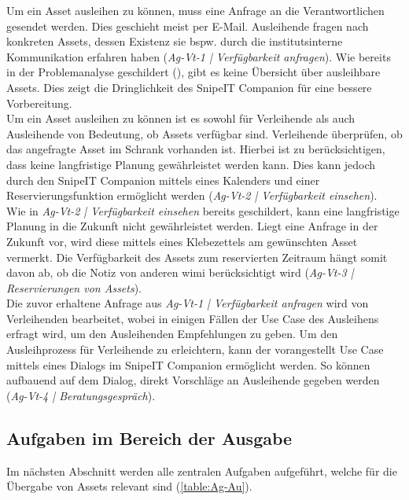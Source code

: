 Um ein Asset ausleihen zu können, muss eine Anfrage an die Verantwortlichen gesendet werden. Dies
geschieht meist per E-Mail. Ausleihende fragen nach konkreten Assets, dessen Existenz sie bspw.
durch die institutsinterne Kommunikation erfahren haben (\textit{Ag-Vt-1 | Verfügbarkeit anfragen}).
Wie bereits in der Problemanalyse geschildert (), gibt es keine
Übersicht über ausleihbare Assets. Dies zeigt die Dringlichkeit des SnipeIT Companion für eine
bessere Vorbereitung.\\
Um ein Asset ausleihen zu können ist es sowohl für Verleihende als auch Ausleihende von Bedeutung,
ob Assets verfügbar sind. Verleihende überprüfen, ob das angefragte Asset im Schrank vorhanden ist.
Hierbei ist zu berücksichtigen, dass keine langfristige Planung gewährleistet werden kann.
 Dies kann jedoch durch den SnipeIT Companion mittels eines Kalenders und einer
Reservierungsfunktion ermöglicht werden (\textit{Ag-Vt-2 | Verfügbarkeit einsehen}).\\
Wie in \textit{Ag-Vt-2 | Verfügbarkeit einsehen} bereits geschildert, kann eine langfristige Planung
in die Zukunft nicht gewährleistet werden. Liegt eine Anfrage in der Zukunft vor, wird diese mittels
eines Klebezettels am gewünschten Asset vermerkt. Die Verfügbarkeit des Assets zum reservierten
Zeitraum hängt somit davon ab, ob die Notiz von anderen \ac{wimi} berücksichtigt wird
(\textit{Ag-Vt-3 | Reservierungen von Assets}). \\
Die zuvor erhaltene Anfrage aus \textit{Ag-Vt-1 | Verfügbarkeit anfragen} wird von Verleihenden
bearbeitet, wobei in einigen Fällen der Use Case des Ausleihens erfragt wird, um den Ausleihenden
Empfehlungen zu geben. Um den Ausleihprozess für Verleihende zu erleichtern, kann der vorangestellt
Use Case mittels eines Dialogs im SnipeIT Companion ermöglicht werden. So können aufbauend auf dem
Dialog, direkt Vorschläge an Ausleihende gegeben werden (\textit{Ag-Vt-4 | Beratungsgespräch}).


\subsection{Aufgaben im Bereich der Ausgabe}
Im nächsten Abschnitt werden alle zentralen Aufgaben aufgeführt, welche für die Übergabe von Assets
relevant sind (\ref{table:Ag-Au}).


